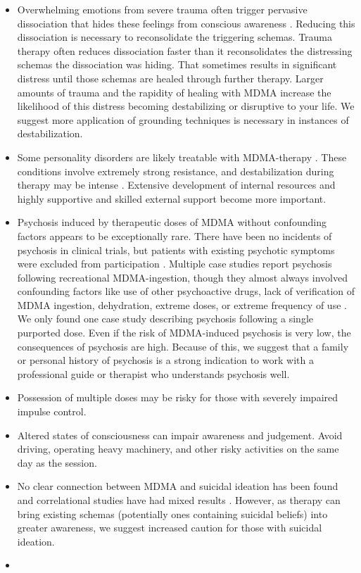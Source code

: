 \documentclass[12pt,letterpaper]{article}
\begin{document}
\begin{itemize}
    \item Overwhelming emotions from severe trauma often trigger pervasive dissociation that hides these feelings from conscious awareness \cite{razviPSIP}. Reducing this dissociation is necessary to reconsolidate the triggering schemas. Trauma therapy often reduces dissociation faster than it reconsolidates the distressing schemas the dissociation was hiding. That sometimes results in significant distress until those schemas are healed through further therapy. Larger amounts of trauma and the rapidity of healing with MDMA increase the likelihood of this distress becoming destabilizing or disruptive to your life. We suggest more application of grounding techniques is necessary in instances of destabilization.  
    \item Some personality disorders are likely treatable with MDMA-therapy \cite{traynorBorderline}. These conditions involve extremely strong resistance, and destabilization during therapy may be intense \cite{razviPSIP}. Extensive development of internal resources and highly supportive and skilled external support become more important.
    \item Psychosis induced by therapeutic doses of MDMA without confounding factors appears to be exceptionally rare. There have been no incidents of psychosis in clinical trials, but patients with existing psychotic symptoms were excluded from participation \cite{smithSystematic,mitchellMDMAClinicalTrial2}. Multiple case studies report psychosis following recreational MDMA-ingestion, though they almost always involved confounding factors like use of other psychoactive drugs, lack of verification of MDMA ingestion, dehydration, extreme doses, or extreme frequency of use \cite{mcguirePsychosis,patelPsychosis,vaivaPsychosis}. We only found one case study describing psychosis following a single purported dose. Even if the risk of MDMA-induced psychosis is very low, the consequences of psychosis are high. Because of this, we suggest that a family or personal history of psychosis is a strong indication to work with a professional guide or therapist who understands psychosis well.
    \item Possession of multiple doses may be risky for those with severely impaired impulse control.
    \item Altered states of consciousness can impair awareness and judgement. Avoid driving, operating heavy machinery, and other risky activities on the same day as the session.
    \item No clear connection between MDMA and suicidal ideation has been found and correlational studies have had mixed results \cite{jonesSuicideAdults,jonesSuicideAdolescents,kimSuicide}. However, as therapy can bring existing schemas (potentially ones containing suicidal beliefs) into greater awareness, we suggest increased caution for those with suicidal ideation. 
    \item {}
\end{itemize}
\end{document}
